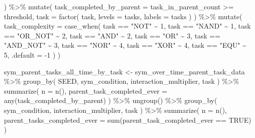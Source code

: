 \documentclass[
]{book}
\newenvironment{Shaded}{\begin{snugshade}}{\end{snugshade}}
\newcommand{\AttributeTok}[1]{\textcolor[rgb]{0.77,0.63,0.00}{#1}}
\newcommand{\ConstantTok}[1]{\textcolor[rgb]{0.00,0.00,0.00}{#1}}
\newcommand{\DecValTok}[1]{\textcolor[rgb]{0.00,0.00,0.81}{#1}}
\newcommand{\FunctionTok}[1]{\textcolor[rgb]{0.00,0.00,0.00}{#1}}
\newcommand{\NormalTok}[1]{#1}
\newcommand{\OtherTok}[1]{\textcolor[rgb]{0.56,0.35,0.01}{#1}}
\newcommand{\SpecialCharTok}[1]{\textcolor[rgb]{0.00,0.00,0.00}{#1}}
\newcommand{\StringTok}[1]{\textcolor[rgb]{0.31,0.60,0.02}{#1}}
\begin{document}
\begin{Shaded}
\begin{Highlighting}[]
\NormalTok{  ) }\SpecialCharTok{\%\textgreater{}\%}
  \FunctionTok{mutate}\NormalTok{(}
    \AttributeTok{task\_completed\_by\_parent =}\NormalTok{ task\_in\_parent\_count }\SpecialCharTok{\textgreater{}=}\NormalTok{ threshold,}
    \AttributeTok{task =} \FunctionTok{factor}\NormalTok{(}
\NormalTok{      task,}
      \AttributeTok{levels =}\NormalTok{ tasks,}
      \AttributeTok{labels =}\NormalTok{ tasks}
\NormalTok{    )}
\NormalTok{  ) }\SpecialCharTok{\%\textgreater{}\%}
  \FunctionTok{mutate}\NormalTok{(}
    \AttributeTok{task\_complexity =} \FunctionTok{case\_when}\NormalTok{(}
\NormalTok{      task }\SpecialCharTok{==} \StringTok{"NOT"} \SpecialCharTok{\textasciitilde{}} \DecValTok{1}\NormalTok{,}
\NormalTok{      task }\SpecialCharTok{==} \StringTok{"NAND"} \SpecialCharTok{\textasciitilde{}} \DecValTok{1}\NormalTok{,}
\NormalTok{      task }\SpecialCharTok{==} \StringTok{"OR\_NOT"} \SpecialCharTok{\textasciitilde{}} \DecValTok{2}\NormalTok{,}
\NormalTok{      task }\SpecialCharTok{==} \StringTok{"AND"} \SpecialCharTok{\textasciitilde{}} \DecValTok{2}\NormalTok{,}
\NormalTok{      task }\SpecialCharTok{==} \StringTok{"OR"} \SpecialCharTok{\textasciitilde{}} \DecValTok{3}\NormalTok{,}
\NormalTok{      task }\SpecialCharTok{==} \StringTok{"AND\_NOT"} \SpecialCharTok{\textasciitilde{}} \DecValTok{3}\NormalTok{,}
\NormalTok{      task }\SpecialCharTok{==} \StringTok{"NOR"} \SpecialCharTok{\textasciitilde{}} \DecValTok{4}\NormalTok{,}
\NormalTok{      task }\SpecialCharTok{==} \StringTok{"XOR"} \SpecialCharTok{\textasciitilde{}} \DecValTok{4}\NormalTok{,}
\NormalTok{      task }\SpecialCharTok{==} \StringTok{"EQU"} \SpecialCharTok{\textasciitilde{}} \DecValTok{5}\NormalTok{,}
      \AttributeTok{.default =} \SpecialCharTok{{-}}\DecValTok{1}
\NormalTok{    )}
\NormalTok{  )}

\NormalTok{sym\_parent\_tasks\_all\_time\_by\_task }\OtherTok{\textless{}{-}}\NormalTok{ sym\_over\_time\_parent\_task\_data }\SpecialCharTok{\%\textgreater{}\%}
  \FunctionTok{group\_by}\NormalTok{(}
\NormalTok{    SEED,}
\NormalTok{    sym\_condition,}
\NormalTok{    interaction\_multiplier,}
\NormalTok{    task}
\NormalTok{  ) }\SpecialCharTok{\%\textgreater{}\%}
  \FunctionTok{summarize}\NormalTok{(}
    \AttributeTok{n =} \FunctionTok{n}\NormalTok{(),}
    \AttributeTok{parent\_task\_completed\_ever =} \FunctionTok{any}\NormalTok{(task\_completed\_by\_parent)}
\NormalTok{  ) }\SpecialCharTok{\%\textgreater{}\%}
  \FunctionTok{ungroup}\NormalTok{() }\SpecialCharTok{\%\textgreater{}\%}
  \FunctionTok{group\_by}\NormalTok{(}
\NormalTok{    sym\_condition,}
\NormalTok{    interaction\_multiplier,}
\NormalTok{    task}
\NormalTok{  ) }\SpecialCharTok{\%\textgreater{}\%}
  \FunctionTok{summarize}\NormalTok{(}
    \AttributeTok{n =} \FunctionTok{n}\NormalTok{(),}
    \AttributeTok{parent\_tasks\_completed\_ever =} \FunctionTok{sum}\NormalTok{(parent\_task\_completed\_ever }\SpecialCharTok{==} \ConstantTok{TRUE}\NormalTok{)}
\NormalTok{  )}
\end{Highlighting}
\end{Shaded}
\end{document}
